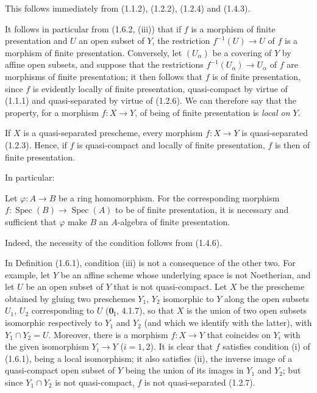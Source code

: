 This follows immediately from (1.1.2), (1.2.2), (1.2.4) and (1.4.3).

It follows in particular from (1.6.2, (iii)) that if $f$ is a morphism of
finite presentation and $U$ an open subset of $Y$, the restriction
$f^{-1}(U)\to U$ of $f$ is a morphism of finite presentation. Conversely,
let $(U_\alpha)$ be a covering of $Y$ by affine open subsets, and suppose
that the restrictions $f^{-1}(U_\alpha)\to U_\alpha$ of $f$ are
morphisms of finite presentation; it then follows that $f$ is of finite
presentation, since $f$ is evidently locally of finite presentation,
quasi-compact by virtue of (1.1.1) and quasi-separated by virtue of (1.2.6).
We can therefore say that the property, for a morphism $f:X\to Y$, of being
of finite presentation is \emph{local on $Y$}.

If $X$ is a quasi-separated prescheme, every morphism $f:X\to Y$ is
quasi-separated (1.2.3). Hence, if $f$ is quasi-compact and locally of finite
presentation, $f$ is then of finite presentation.

In particular:

\begin{corollary}[1.6.3]
\label{IV.1.6.3}
Let $\varphi:A\to B$ be a ring homomorphism. For the corresponding
morphism $f:\operatorname{Spec}(B)\to\operatorname{Spec}(A)$ to be of finite presentation, it is necessary and
sufficient that $\varphi$ make $B$ an $A$-algebra of finite presentation.
\end{corollary}

Indeed, the necessity of the condition follows from (1.4.6).

\begin{remark}[1.6.4]
\label{IV.1.6.4}
In Definition (1.6.1), condition (iii) is not a consequence of the other
two. For example, let $Y$ be an affine scheme whose underlying space is not
Noetherian, and let $U$ be an open subset of $Y$ that is not quasi-compact.
Let $X$ be the prescheme obtained by gluing two preschemes $Y_1$, $Y_2$
isomorphic to $Y$ along the open subsets $U_1$, $U_2$ corresponding to $U$
($\mathbf{0}_{\mathrm I}$,
4.1.7), so that $X$ is the union of two open subsets isomorphic respectively
to $Y_1$ and $Y_2$ (and which we identify with the latter), with
$Y_1\cap Y_2=U$. Moreover, there is a morphism $f:X\to Y$ that coincides on
$Y_i$ with the given isomorphism $Y_i\to Y$ ($i=1,2$). It is clear that $f$
satisfies condition (i) of (1.6.1), being a local isomorphism; it also
satisfies (ii), the inverse image of a quasi-compact open subset of $Y$ being
the union of its images in $Y_1$ and $Y_2$; but since $Y_1\cap Y_2$ is not
quasi-compact, $f$ is not quasi-separated (1.2.7).
\end{remark}

